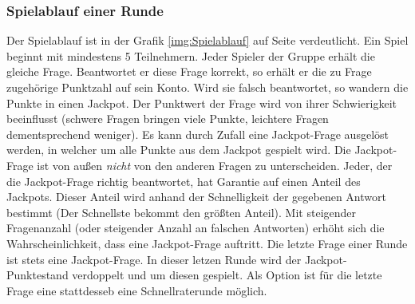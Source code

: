 \documentclass[11pt,a4paper]{scrreprt}
\begin{document}
\subsubsection{Spielablauf einer Runde}
Der Spielablauf ist in der Grafik \ref{img:Spielablauf} auf Seite \pageref{img:Spielablauf} verdeutlicht.
Ein Spiel beginnt mit mindestens 5 Teilnehmern. Jeder Spieler der Gruppe erhält die gleiche Frage. Beantwortet er diese Frage korrekt, so erhält er die zu Frage zugehörige Punktzahl auf sein Konto. Wird sie falsch beantwortet, so wandern die Punkte in einen Jackpot. Der Punktwert der Frage wird von ihrer Schwierigkeit beeinflusst (schwere Fragen bringen viele Punkte, leichtere Fragen dementsprechend weniger). Es kann durch Zufall eine Jackpot-Frage ausgelöst werden, in welcher um alle Punkte aus dem Jackpot gespielt wird. Die Jackpot-Frage ist von außen \textit{nicht} von den anderen Fragen zu unterscheiden. Jeder, der die Jackpot-Frage richtig beantwortet, hat Garantie auf einen Anteil des Jackpots. Dieser Anteil wird anhand der Schnelligkeit der gegebenen Antwort bestimmt (Der Schnellste bekommt den größten Anteil). Mit steigender Fragenanzahl (oder steigender Anzahl an falschen Antworten) erhöht sich die Wahrscheinlichkeit, dass eine Jackpot-Frage auftritt. Die letzte Frage einer Runde ist stets eine Jackpot-Frage. In dieser letzen Runde wird der Jackpot-Punktestand verdoppelt und um diesen gespielt. Als Option ist für die letzte Frage eine stattdesseb eine Schnellraterunde möglich.
\end{document}
